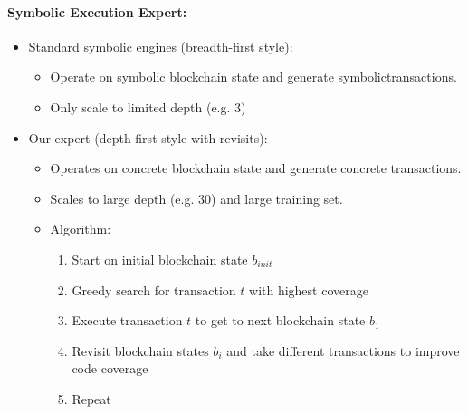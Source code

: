 \paragraph{Symbolic Execution Expert:}
\begin{itemize}
    \item Standard symbolic engines (breadth-first style):
    \begin{itemize}
        \item Operate on symbolic blockchain state and generate symbolictransactions.
        \item Only scale to limited depth (e.g. 3)
    \end{itemize}{}
    \item Our expert (depth-first style with revisits):
    \begin{itemize}
        \item Operates on concrete blockchain state and generate concrete transactions.
        \item Scales to large depth (e.g. 30) and large training set.
        \item Algorithm:
        \begin{enumerate}
            \item Start on initial blockchain state $b_{init}$
            \item Greedy search for transaction $t$ with highest coverage
            \item Execute transaction $t$ to get to next blockchain state $b_1$
            \item Revisit blockchain states $b_i$ and take different transactions to improve code coverage
            \item Repeat
        \end{enumerate}{}
 \end{itemize}
\end{itemize}{}
